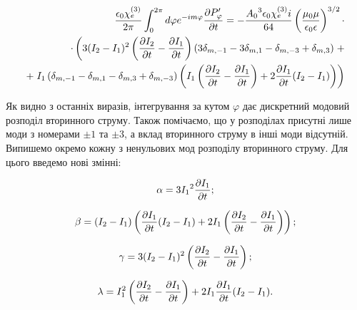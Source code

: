 %
\begin{equation*} \begin{aligned}
\frac{\epsilon_0 \chi_e^{(3)}}{2 \pi} \int_{0}^{2 \pi} d \varphi 
e^{-im \varphi} \frac{\partial P_\varphi^\prime}{\partial t} = 
- \frac{ {A_0}^3 \epsilon_0 \chi_e^{(3)}  i}{ 64 }
\left( \frac{\mu_0 \mu} {\epsilon_0 \epsilon} \right)^{3/2} \cdot \\ 
\cdot \left( 3 ( I_2 - I_1 )^2 \left( \frac{\partial I_2}{\partial t} - 
\frac{\partial I_1}{\partial t} \right) \left( 3 \delta_{m,-1} - 3 \delta_{m,1} - 
\delta_{m,-3} + \delta_{m,3} \right) \right. + \\
+ \left. I_1 \left( \delta_{m,-1} - \delta_{m,1} - 
\delta_{m,3} + \delta_{m,-3} \right) \left( 
I_1 \left( \frac{\partial I_2}{\partial t} - \frac{\partial I_1}{\partial t} \right) + 
2 \frac{\partial I_1}{\partial t} (I_2 - I_1) \right) \right)
\end{aligned} \end{equation*}

Як видно з останніх виразів, інтегрування за кутом $ \varphi $ дає дискретний 
модовий розподіл вторинного струму.  Також помічаємо, що у розподілах присутні 
лише моди з номерами $ \pm 1 $ та $ \pm 3 $, а вклад вторинного струму в 
інші моди відсутній. Випишемо окремо кожну з ненульових мод розподілу 
вторинного струму. Для цього введемо нові змінні:

\begin{equation} \begin{aligned} \label{eq:alpha}
\alpha = 3 {I_1}^2 \frac{\partial I_1}{\partial t};
\end{aligned} \end{equation}

\begin{equation} \begin{aligned} \label{eq:beta}
\beta = ( I_2 - I_1 ) \left( \frac{\partial I_1}{\partial t} ( I_2 - I_1 ) + 
2 I_1 \left( \frac{\partial I_2}{\partial t} - \frac{\partial I_1}{\partial t} \right) \right);
\end{aligned} \end{equation}

\begin{equation} \begin{aligned} \label{eq:gamma}
\gamma = 3 ( I_2 - I_1 )^2 \left( \frac{\partial I_2}{\partial t} - \frac{\partial I_1}{\partial t} \right);
\end{aligned} \end{equation}

\begin{equation} \begin{aligned} \label{eq:lambda}
\lambda = I_1^2 \left( \frac{\partial I_2}{\partial t} - 
\frac{\partial I_1}{\partial t} \right) + 2 I_1 \frac{\partial I_1}{\partial t} (I_2 - I_1).
\end{aligned} \end{equation}

